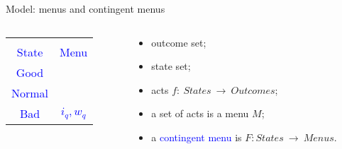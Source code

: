 \documentclass[usenames,dvipsnames,aspectratio=169,11pt, envcountsect, handout]{beamer}
\begin{document}
\begin{frame}[noframenumbering]{Model: menus and contingent menus}
	\vfill

	\begin{columns}
		\begin{column}{0.45\textwidth}  %
			\begin{center}

				\begin{table}[H]
					\centering
					\begin{tabular}{c | c}
						\multicolumn{2}{c}{}                                                         \\
						\textcolor{blue}{State}  & \textcolor{blue}{Menu}                            \\
						\hline
						\textcolor{blue}{Good}   & \textcolor{blue}{\multirow{2}{*}{\( i_p, w_p \)}} \\
						\textcolor{blue}{Normal} & \textcolor{blue}{}                                \\
						\textcolor{blue}{Bad}    & \textcolor{blue}{\( i_q, w_q \)}                  \\
					\end{tabular}
				\end{table}
			\end{center}
		\end{column}

		\begin{column}{0.55\textwidth}  %
			\begin{itemize}
				\item outcome set;
				\item state set;
				\item acts \( f : \: States \: \rightarrow \: Outcomes \);
				\item a set of acts is a menu \( M \);
				\item a \textcolor{blue}{contingent menu} is \(F: States \: \rightarrow \: Menus \).
			\end{itemize}
		\end{column}
	\end{columns}

\end{frame}
\end{document}
